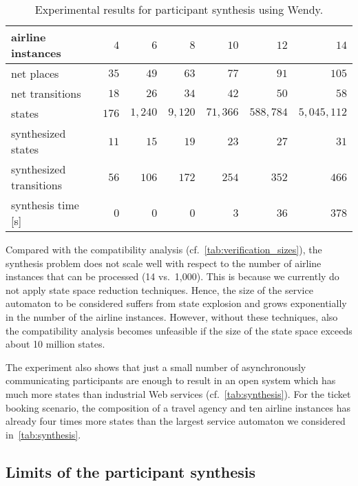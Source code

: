\begin{table}
\centering
\caption{Experimental results for participant synthesis using Wendy.}
\medskip
\label{tab:syn}
\footnotesize
\begin{tabular*}{\textwidth}{@{\extracolsep{\fill}}lrrrrrr}
\toprule
airline instances  & $4$ & $6$ & $8$ & $10$ & $12$ & $14$ \\ \midrule
net places       & $35$ & $49$ & $63$ & $77$ & $91$ & $105$ \\
net transitions  &$18$ & $26$ & $34$& $42$& $50$& $58$  \\
states  & $176$ & $1{,}240$ & $9{,}120$ & $71{,}366$ & $588{,}784$ & $5{,}045{,}112$ \\ \midrule
synthesized states  & $11$ & $15$ & $19$ & $23$ & $27$ & $31$\\
synthesized transitions  & $56$ & $106$ & $172$ & $254$ & $352$ & $466$ \\
synthesis time [s] & $0$& $0$ & $0$ & $3$ & $36$ & $378$ \\
\bottomrule
\end{tabular*}
\end{table}

Compared with the compatibility analysis (cf.~\autoref{tab:verification_sizes}), the synthesis problem does not scale well with respect to the number of airline instances that can be processed (14 vs.\ 1{,}000). This is because we currently do not apply state space reduction techniques. Hence, the size of the service automaton to be considered suffers from state explosion and grows exponentially in the number of the airline instances. However, without these techniques, also the compatibility analysis becomes unfeasible if the size of the state space exceeds about 10 million states.

The experiment also shows that just a small number of asynchronously communicating participants are enough to result in an open system which has much more states than industrial Web services (cf.~\autoref{tab:synthesis}). For the ticket booking scenario, the composition of a travel agency and ten airline instances has already four times more states than the largest service automaton we considered in~\autoref{tab:synthesis}.




\subsection*{Limits of the participant synthesis}

